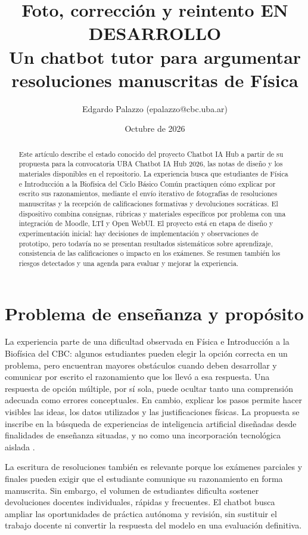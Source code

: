 \documentclass[11pt,a4paper]{article}
\title{Foto, corrección y reintento \textsc{EN DESARROLLO}\\
\large Un chatbot tutor para argumentar resoluciones manuscritas de Física}
\author{Edgardo Palazzo (epalazzo@cbc.uba.ar)}
\date{Octubre de 2026}
\begin{document}
\maketitle

\begin{abstract}
Este artículo describe el estado conocido del proyecto Chatbot IA Hub a partir de su propuesta para la convocatoria UBA Chatbot IA Hub 2026, las notas de diseño y los materiales disponibles en el repositorio. La experiencia busca que estudiantes de Física e Introducción a la Biofísica del Ciclo Básico Común practiquen cómo explicar por escrito sus razonamientos, mediante el envío iterativo de fotografías de resoluciones manuscritas y la recepción de calificaciones formativas y devoluciones socráticas. El dispositivo combina consignas, rúbricas y materiales específicos por problema con una integración de Moodle, LTI y Open WebUI. El proyecto está en etapa de diseño y experimentación inicial: hay decisiones de implementación y observaciones de prototipo, pero todavía no se presentan resultados sistemáticos sobre aprendizaje, consistencia de las calificaciones o impacto en los exámenes. Se resumen también los riesgos detectados y una agenda para evaluar y mejorar la experiencia.
\end{abstract}

\section{Problema de enseñanza y propósito}

La experiencia parte de una dificultad observada en Física e Introducción a la Biofísica del CBC: algunos estudiantes pueden elegir la opción correcta en un problema, pero encuentran mayores obstáculos cuando deben desarrollar y comunicar por escrito el razonamiento que los llevó a esa respuesta. Una respuesta de opción múltiple, por sí sola, puede ocultar tanto una comprensión adecuada como errores conceptuales. En cambio, explicar los pasos permite hacer visibles las ideas, los datos utilizados y las justificaciones físicas. La propuesta se inscribe en la búsqueda de experiencias de inteligencia artificial diseñadas desde finalidades de enseñanza situadas, y no como una incorporación tecnológica aislada \cite{andreoli,propuesta}.

La escritura de resoluciones también es relevante porque los exámenes parciales y finales pueden exigir que el estudiante comunique su razonamiento en forma manuscrita. Sin embargo, el volumen de estudiantes dificulta sostener devoluciones docentes individuales, rápidas y frecuentes. El chatbot busca ampliar las oportunidades de práctica autónoma y revisión, sin sustituir el trabajo docente ni convertir la respuesta del modelo en una evaluación definitiva.
\end{document}
